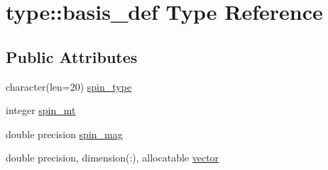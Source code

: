 \hypertarget{typetype_1_1basis__def}{
\section{type::basis\_\-def Type Reference}
\label{typetype_1_1basis__def}
}
\subsection*{Public Attributes}
\begin{DoxyCompactItemize}
\item 
character(len=20) \hyperlink{typetype_1_1basis__def_ac9df01c9bb86c48e83b703c5ff572bd4}{spin\_\-type}
\item 
integer \hyperlink{typetype_1_1basis__def_ae2f992ef5c95d356fc17c7fb3d2ddb05}{spin\_\-mt}
\item 
double precision \hyperlink{typetype_1_1basis__def_a83ca561a604c3e055d4abe811a1106e0}{spin\_\-mag}
\item 
double precision, dimension(:), allocatable \hyperlink{typetype_1_1basis__def_ad4d4c5c525a549e1d0970bf2ed2839ca}{vector}
\end{DoxyCompactItemize}


